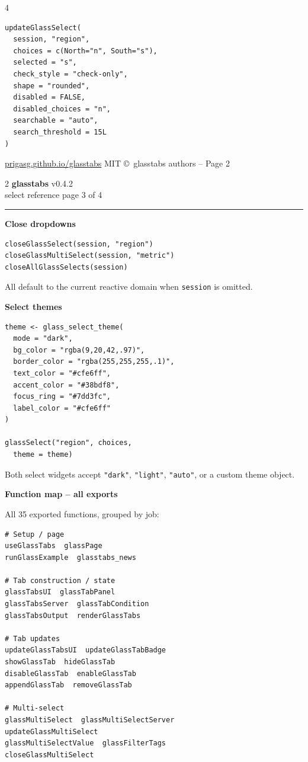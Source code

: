 \documentclass[9pt,a4paper]{article}
\newcommand{\code}[1]{\texttt{\footnotesize\color{codefg}#1}}
\newcommand{\gtval}[1]{\texttt{\footnotesize\color{gtyellow}#1}}
\newcommand{\mysection}[1]{%
  \vspace{3pt}%
  \noindent\colorbox{sectionbg}{%
    \parbox{\dimexpr\linewidth-2\fboxsep\relax}{%
      \strut\textbf{\small\color{white}#1}\strut%
    }%
  }%
  \vspace{2pt}\par%
}
\newcommand{\sheetheader}[2]{%
  {\large\bfseries\color{gtblue}glasstabs}%
  \hfill{\tiny\color{gtgray}v0.4.2}\\[1pt]
  {\footnotesize\color{gtgray}#1}%
  \hfill{\tiny\color{gtgray}#2}\\[-3pt]
  \rule{\linewidth}{0.6pt}
}
\begin{document}
\begin{multicols*}{4}
\begin{lstlisting}
updateGlassSelect(
  session, "region",
  choices = c(North="n", South="s"),
  selected = "s",
  check_style = "check-only",
  shape = "rounded",
  disabled = FALSE,
  disabled_choices = "n",
  searchable = "auto",
  search_threshold = 15L
)
\end{lstlisting}

\vfill
{\tiny\color{gtgray}
\href{https://prigasg.github.io/glasstabs/}{prigasg.github.io/glasstabs}
\hfill MIT \copyright\ glasstabs authors -- Page 2}
\end{multicols*}

\newpage
\begin{multicols*}{2}
\raggedcolumns
\footnotesize
\sheetheader{select reference}{page 3 of 4}

\mysection{Close dropdowns}

\begin{lstlisting}
closeGlassSelect(session, "region")
closeGlassMultiSelect(session, "metric")
closeAllGlassSelects(session)
\end{lstlisting}
All default to the current reactive domain when
\code{session} is omitted.

\mysection{Select themes}

\begin{lstlisting}
theme <- glass_select_theme(
  mode = "dark",
  bg_color = "rgba(9,20,42,.97)",
  border_color = "rgba(255,255,255,.1)",
  text_color = "#cfe6ff",
  accent_color = "#38bdf8",
  focus_ring = "#7dd3fc",
  label_color = "#cfe6ff"
)

glassSelect("region", choices,
  theme = theme)
\end{lstlisting}
Both select widgets accept \gtval{"dark"}, \gtval{"light"},
\gtval{"auto"}, or a custom theme object.

\mysection{Function map -- all exports}

All 35 exported functions, grouped by job:
\begin{lstlisting}
# Setup / page
useGlassTabs  glassPage
runGlassExample  glasstabs_news

# Tab construction / state
glassTabsUI  glassTabPanel
glassTabsServer  glassTabCondition
glassTabsOutput  renderGlassTabs

# Tab updates
updateGlassTabsUI  updateGlassTabBadge
showGlassTab  hideGlassTab
disableGlassTab  enableGlassTab
appendGlassTab  removeGlassTab

# Multi-select
glassMultiSelect  glassMultiSelectServer
updateGlassMultiSelect
glassMultiSelectValue  glassFilterTags
closeGlassMultiSelect


\end{lstlisting}
\end{multicols*}
\end{document}

